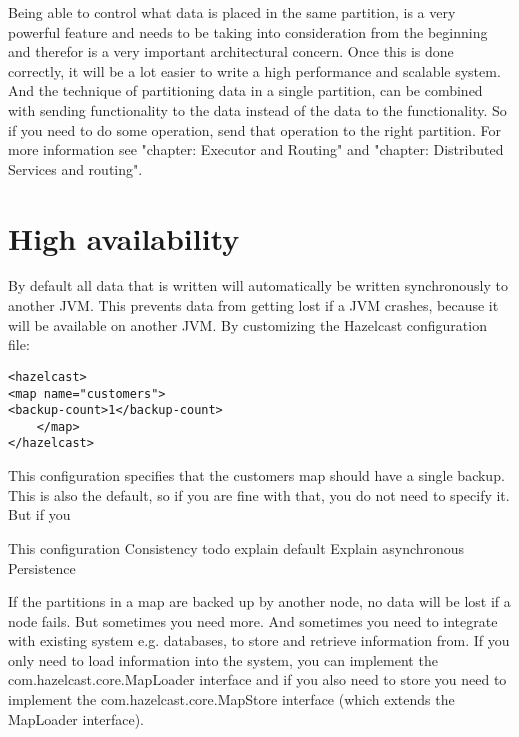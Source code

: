 Being able to control what data is placed in the same partition, is a very powerful feature and needs to be taking into consideration from the beginning and therefor is a very important architectural concern. Once this is done correctly, it will be a lot easier to write a high performance and scalable system. And the technique of partitioning data in a single partition, can be combined with sending functionality to the data instead of the data to the functionality. So if you need to do some operation, send that operation to the right partition. For more information see "chapter: Executor and Routing" and "chapter: Distributed Services and routing".

\section{High availability}
By default all data that is written will automatically be written synchronously to another JVM. This prevents data from getting lost if a JVM crashes, because it will be available on another JVM. By customizing the Hazelcast configuration file:
\begin{verbatim}
<hazelcast> 
<map name="customers"> 
<backup-count>1</backup-count>
 	</map> 
</hazelcast>
\end{verbatim}

This configuration specifies that the customers map should have a single backup. This is also the default, so if you are fine with that, you do not need to specify it. But if you 

This configuration 
Consistency
todo explain default
Explain asynchronous
Persistence

If the partitions in a map are backed up by another node, no data will be lost if a node fails. But sometimes you need more. And sometimes you need to integrate with existing system e.g. databases, to store and retrieve information from. If you only need to load information into the system, you can implement the com.hazelcast.core.MapLoader interface and if you also need to store you need to implement the com.hazelcast.core.MapStore interface (which extends the MapLoader interface).

